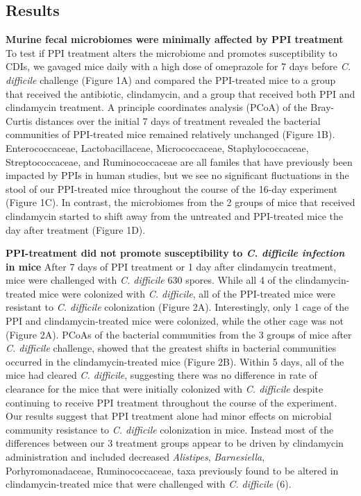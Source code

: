 \documentclass[11pt,]{article}
\begin{document}
\subsection{Results}\label{results}

\textbf{Murine fecal microbiomes were minimally affected by PPI
treatment } To test if PPI treatment alters the microbiome and promotes
susceptibility to CDIs, we gavaged mice daily with a high dose of
omeprazole for 7 days before \emph{C. difficile} challenge (Figure 1A)
and compared the PPI-treated mice to a group that received the
antibiotic, clindamycin, and a group that received both PPI and
clindamycin treatment. A principle coordinates analysis (PCoA) of the
Bray-Curtis distances over the initial 7 days of treatment revealed the
bacterial communities of PPI-treated mice remained relatively unchanged
(Figure 1B). Enterococcaceae, Lactobacillaceae, Micrococcaceae,
Staphylococcaceae, Streptococcaceae, and Ruminococcaceae are all familes
that have previously been impacted by PPIs in human studies, but we see
no significant fluctuations in the stool of our PPI-treated mice
throughout the course of the 16-day experiment (Figure 1C). In contrast,
the microbiomes from the 2 groups of mice that received clindamycin
started to shift away from the untreated and PPI-treated mice the day
after treatment (Figure 1D).

\textbf{PPI-treatment did not promote susceptibility to \emph{C.
difficile infection} in mice} After 7 days of PPI treatment or 1 day
after clindamycin treatment, mice were challenged with \emph{C.
difficile} 630 spores. While all 4 of the clindamycin-treated mice were
colonized with \emph{C. difficile}, all of the PPI-treated mice were
resistant to \emph{C. difficile} colonization (Figure 2A).
Interestingly, only 1 cage of the PPI and clindamycin-treated mice were
colonized, while the other cage was not (Figure 2A). PCoAs of the
bacterial communities from the 3 groups of mice after \emph{C.
difficile} challenge, showed that the greatest shifts in bacterial
communities occurred in the clindamycin-treated mice (Figure 2B). Within
5 days, all of the mice had cleared \emph{C. difficile}, suggesting
there was no difference in rate of clearance for the mice that were
initially colonized with \emph{C. difficile} despite continuing to
receive PPI treatment throughout the course of the experiment. Our
results suggest that PPI treatment alone had minor effects on microbial
community resistance to \emph{C. difficile} colonization in mice.
Instead most of the differences between our 3 treatment groups appear to
be driven by clindamycin administration and included decreased
\emph{Alistipes}, \emph{Barnesiella}, Porhyromonadaceae,
Ruminococcaceae, taxa previously found to be altered in
clindamycin-treated mice that were challenged with \emph{C. difficile}
(6).
\end{document}
